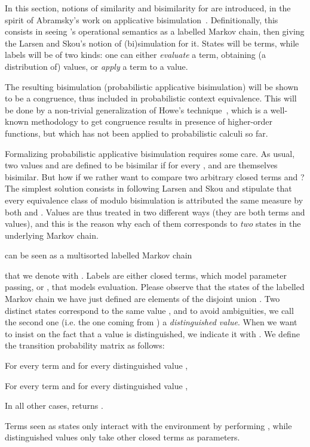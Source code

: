 

In this section, notions of similarity and bisimilarity for  are introduced, in
the spirit of Abramsky's work on applicative bisimulation~\cite{Abramsky-90}. Definitionally, this
consists in seeing 's operational semantics as a labelled Markov chain, then giving
the Larsen and Skou's notion of (bi)simulation for it. States will be terms, while labels
will be of two kinds: one can either \emph{evaluate} a term, obtaining (a distribution of) values, 
or \emph{apply} a term to a value.

The resulting bisimulation (probabilistic applicative bisimulation) 
will be shown to be a congruence, thus included in probabilistic context equivalence.
This will be done by a non-trivial generalization of Howe's technique~\cite{Howe-96}, which is
a well-known methodology to get congruence results in presence of higher-order functions, but
which has not been applied to probabilistic calculi so far. 

Formalizing probabilistic applicative bisimulation requires some care.
As usual, two values  and  are defined
to be bisimilar if for every , 
and  are themselves bisimilar. But how if
we rather want to compare two arbitrary closed terms  and ?
The simplest solution consists in following Larsen and Skou and stipulate that
every equivalence class of  modulo bisimulation is attributed the same
measure by both  and . Values
are thus treated in two different ways (they are both terms and values), and this is the reason why each of
them corresponds to \emph{two} states in the underlying Markov chain.


\begin{definition}
\label{d:multisort}
 can be seen as a multisorted labelled Markov chain

that we denote with . Labels are either closed terms, which model
parameter passing, or , that models evaluation. 
Please observe that the states of the labelled Markov chain we have 
just defined are elements of the disjoint union . 
Two distinct states correspond to the
same value , and to avoid ambiguities, we call the second one
(i.e. the one coming from ) a \emph{distinguished value}.  When we
want to insist on the fact that a value  is
distinguished, we indicate it with . We
define the transition probability matrix  as follows:
\begin{varitemize}
\item 
  For every term  and for every 
  distinguished value ,
  
\item 
  For every term  and for every distinguished value ,
  
\item
  In all other cases,  returns .
\end{varitemize}
\end{definition}
Terms seen as states  only interact with the
environment by performing , while distinguished values 
only take other closed terms as parameters. 

